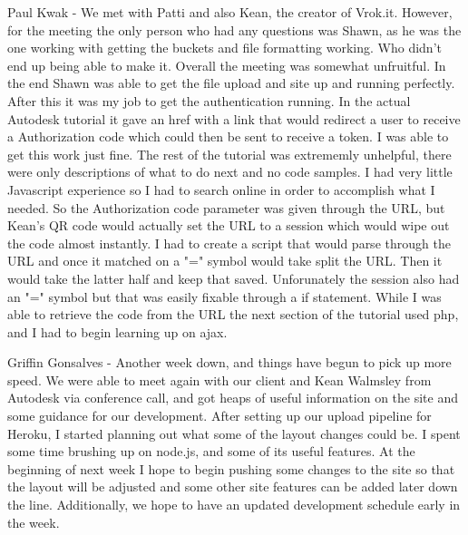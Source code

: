 \documentclass[10pt,draftclsnofoot,onecolumn]{IEEEtran}
\begin{document}
Paul Kwak - We met with Patti and also Kean, the creator of Vrok.it. However, for the meeting the only person who had any questions was Shawn, as he was the one working with getting the buckets and file formatting working. Who didn't end up being able to make it. Overall the meeting was somewhat unfruitful. In the end Shawn was able to get the file upload and site up and running perfectly. After this it was my job to get the authentication running. In the actual Autodesk tutorial it gave an href with a link that would redirect a user to receive a Authorization code which could then be sent to receive a token. I was able to get this work just fine. The rest of the tutorial was extrememly unhelpful, there were only descriptions of what to do next and no code samples. I had very little Javascript experience so I had to search online in order to accomplish what I needed. So the Authorization code parameter was given through the URL, but Kean's QR code would actually set the URL to a session which would wipe out the code almost instantly. I had to create a script that would parse through the URL and once it matched on a "=" symbol would take split the URL. Then it would take the latter half and keep that saved. Unforunately the session also had an "=" symbol but that was easily fixable through a if statement. While I was able to retrieve the code from the URL the next section of the tutorial used php, and I had to begin learning up on ajax.

Griffin Gonsalves - Another week down, and things have begun to pick up more speed. We were able to meet again with our client and Kean Walmsley from Autodesk via conference call, and got heaps of useful information on the site and some guidance for our development. After setting up our upload pipeline for Heroku, I started planning out what some of the layout changes could be. I spent some time brushing up on node.js, and some of its useful features. At the beginning of next week I hope to begin pushing some changes to the site so that the layout will be adjusted and some other site features can be added later down the line. Additionally, we hope to have an updated development schedule early in the week.
\end{document}
